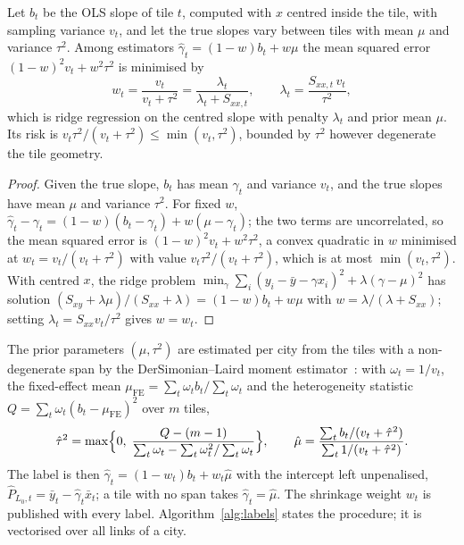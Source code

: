 \begin{proposition}
\label{prop:eb}
Let $b_t$ be the OLS slope of tile $t$, computed with $x$ centred inside
the tile, with sampling variance $v_t$, and let the true slopes vary between
tiles with mean $\mu$ and variance $\tau^{2}$. Among estimators
$\hat\gamma_t=(1-w)b_t+w\mu$ the mean squared error $(1-w)^{2}v_t+w^{2}\tau^{2}$
is minimised by
\begin{equation}
w_t=\frac{v_t}{v_t+\tau^{2}}=\frac{\lambda_t}{\lambda_t+S_{xx,t}},
\qquad \lambda_t=\frac{S_{xx,t}\,v_t}{\tau^{2}},
\label{eq:eb}
\end{equation}
which is ridge regression on the centred slope with penalty $\lambda_t$
and prior mean $\mu$. Its risk is $v_t\tau^{2}/(v_t+\tau^{2})\le\min(v_t,\tau^{2})$,
bounded by $\tau^{2}$ however degenerate the tile geometry.
\end{proposition}
\begin{proof}
Given the true slope, $b_t$ has mean $\gamma_t$ and variance $v_t$, and the
true slopes have mean $\mu$ and variance $\tau^{2}$. For fixed $w$,
$\hat\gamma_t-\gamma_t=(1-w)(b_t-\gamma_t)+w(\mu-\gamma_t)$; the two terms
are uncorrelated, so the mean squared error is $(1-w)^{2}v_t+w^{2}\tau^{2}$,
a convex quadratic in $w$ minimised at $w_t=v_t/(v_t+\tau^{2})$ with value
$v_t\tau^{2}/(v_t+\tau^{2})$, which is at most $\min(v_t,\tau^{2})$. With
centred $x$, the ridge problem
$\min_\gamma\sum_i(y_i-\bar y-\gamma x_i)^{2}+\lambda(\gamma-\mu)^{2}$ has
solution $(S_{xy}+\lambda\mu)/(S_{xx}+\lambda)=(1-w)b_t+w\mu$ with
$w=\lambda/(\lambda+S_{xx})$; setting $\lambda_t=S_{xx}v_t/\tau^{2}$ gives
$w=w_t$.
\end{proof}

\noindent The prior parameters $(\mu,\tau^{2})$ are estimated per city
from the tiles with a non-degenerate span by the DerSimonian--Laird moment
estimator~\cite{dersimonian1986}: with $\omega_t=1/v_t$, the fixed-effect
mean $\mu_{\mathrm{FE}}=\sum_t\omega_t b_t/\sum_t\omega_t$ and the
heterogeneity statistic $Q=\sum_t\omega_t(b_t-\mu_{\mathrm{FE}})^{2}$ over
$m$ tiles,
\begin{equation}
\hat\tau^{2}=\max\Bigl\{0,\;\frac{Q-(m-1)}{\sum_t\omega_t-\sum_t\omega_t^{2}/\sum_t\omega_t}\Bigr\},
\qquad
\hat\mu=\frac{\sum_t b_t/(v_t+\hat\tau^{2})}{\sum_t 1/(v_t+\hat\tau^{2})} .
\label{eq:dl}
\end{equation}
The label is then $\hat\gamma_t=(1-w_t)b_t+w_t\hat\mu$ with the intercept
left unpenalised, $\hat P_{L_0,t}=\bar y_t-\hat\gamma_t\bar x_t$; a tile with
no span takes $\hat\gamma_t=\hat\mu$. The shrinkage weight $w_t$ is
published with every label. Algorithm~\ref{alg:labels} states the
procedure; it is vectorised over all links of a city.

